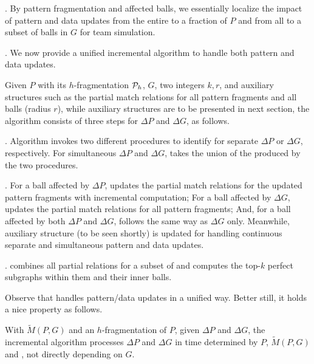 . By pattern fragmentation and affected balls, we essentially localize the impact of pattern and data updates from the entire to a fraction of $P$ and from all to a subset of balls in $G$ for team simulation.


. We now provide a unified incremental algorithm \inc  to handle both pattern and data updates.


Given $P$ with its $h$-fragmentation ${\cal P}_{h}$, $G$, two integers $k, r$,
and auxiliary structures such as the partial match relations for all pattern fragments and all balls (radius $r$),
while auxiliary structures are to be presented in next section,
the algorithm consists of three steps for $\Delta P$ and $\Delta G$, as follows.


.
Algorithm \inc invokes two different procedures to identify \affballsx for separate $\Delta P$ or $\Delta G$, respectively.
For  simultaneous $\Delta P$ and $\Delta G$, \inc takes the union of the \affballsx produced by  the two procedures.


.
For a ball affected by $\Delta P$, \inc updates the partial match relations for the updated pattern fragments with incremental computation;
For a ball affected by $\Delta G$, \inc updates the partial match relations for all pattern fragments;
And, for a ball affected by both $\Delta P$ and $\Delta G$, \inc follows the same way as $\Delta G$ only.
Meanwhile, auxiliary structure \fb (to be seen shortly) is updated for handling continuous separate and simultaneous pattern and data updates.


. \inc combines all partial relations for a subset of \affballsx and computes the top-$k$ perfect subgraphs within them and their inner balls.

\vspace{0.5ex}
Observe that \inc handles pattern/data updates in a unified way. Better still, it holds a nice property as follows.


\begin{theorem}
\label{thm-framework-inc}
With $\tilde{M}(P,G)$ and \fb \wrt an $h$-fragmentation of $P$, given $\Delta P$ and $\Delta G$,
the incremental algorithm \inc processes $\Delta P$ and $\Delta G$ in time
determined by $P$, $\tilde{M}(P,G)$ and \affballsx, not directly depending on $G$.
\end{theorem}

